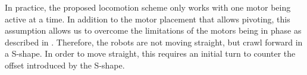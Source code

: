 \documentclass[letterpaper, 10pt, conference]{ieeeconf}
\newcounter{comcount}
\newcommand{\mycomment}[1]
{
\refstepcounter{comcount}
\smallskip\noindent\fbox{\parbox{\linewidth}{\emph{Comment \arabic{comcount}} : \small{#1}}} 
}
\begin{document}
%
%

In practice, the proposed locomotion scheme only works with one motor being active at a time. In addition to the motor placement that allows pivoting, this assumption allows us to overcome the limitations of the motors being in phase as described in \cite{Vartholomeos2005}. Therefore, the robots are not moving straight, but crawl forward in a S-shape. In order to move straight, this requires an initial turn to counter the offset introduced by the S-shape. 
\end{document}
